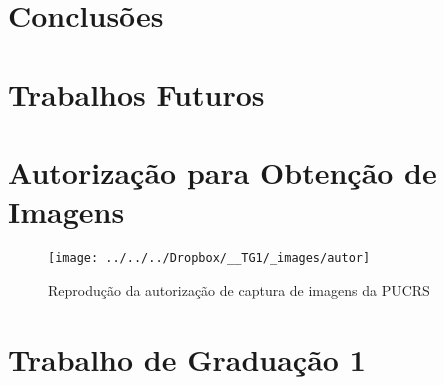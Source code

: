 \documentclass[ecp,tc]{iiufrgs}
\begin{document}
\chapter{Conclusões}

\chapter{Trabalhos Futuros}

\nocite{Sobral2014}
\nocite{6264659}
\nocite{KaewTraKulPong2002}
\nocite{BinZabawi2013}
\nocite{Lin2006}



\annex
\chapter{Autorização para Obtenção de Imagens}
\label{autoriz}
\begin{figure}[h]
	\caption{Reprodução da autorização de captura de imagens da PUCRS}
	\centering
	\texttt{[image: ../../../Dropbox/\_\_TG1/\_images/autor]}
	\label{fig:autor}
\end{figure}


\chapter{Trabalho de Graduação 1}
\label{tg1}
\end{document}
